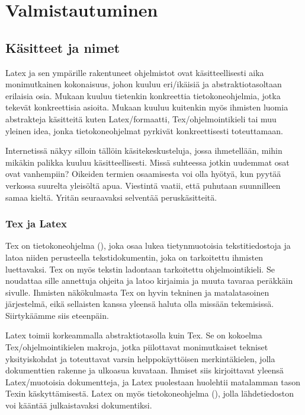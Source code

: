 \chapter{Valmistautuminen}

\section{Käsitteet ja nimet}

Latex ja sen ympärille rakentuneet ohjelmistot ovat käsitteellisesti
aika monimutkainen kokonaisuus, johon kuuluu eri\-/ikäisiä ja
abst\-rak\-tio\-ta\-sol\-taan erilaisia osia. Mukaan kuuluu tietenkin
konkreettia tie\-to\-kone\-oh\-jel\-mia, jotka tekevät konkreettisia
asioita. Mukaan kuuluu kuitenkin myös ihmisten luomia abst\-rak\-te\-ja
käsitteitä kuten Latex\-/formaatti, Tex\-/ohjelmointikieli tai muu
yleinen idea, jonka tieto\-kone\-ohjelmat pyrkivät konk\-reet\-tisesti
toteuttamaan.

Internetissä näkyy silloin tällöin käsitekeskusteluja, jossa
ihmetellään, mihin mikäkin palikka kuuluu käsitteellisesti. Missä
suhteessa jotkin uudemmat osat ovat vanhempiin? Oikeiden termien
osaamisesta voi olla hyötyä, kun pyytää verkossa suurelta yleisöltä
apua. Viestintä vaatii, että puhutaan suunnilleen samaa kieltä. Yritän
seuraavaksi selventää peruskäsitteitä.

\subsection{Tex ja Latex}

Tex on tietokone\-ohjelma (), joka osaa lukea tietynmuotoisia
tekstitiedostoja ja latoa niiden perusteella tekstidokumentin, joka on
tarkoitettu ihmisten luettavaksi. Tex on myös tekstin ladontaan
tarkoitettu ohjelmointikieli. Se noudattaa sille annettuja ohjeita ja
latoo kirjaimia ja muuta tavaraa peräkkäin sivulle. Ihmisten
näkökulmasta Tex on hyvin tekninen ja matalatasoinen järjestelmä, eikä
sellaisten kanssa yleensä haluta olla missään tekemisissä. Siirtykäämme
siis eteenpäin.

Latex toimii korkeammalla abstraktiotasolla kuin Tex. Se on kokoelma
Tex\-/ohjelmointikielen makroja, jotka piilottavat monimutkaiset
tekniset yksityiskohdat ja toteuttavat varsin helppokäyttöisen
merkintäkielen, jolla dokumenttien rakenne ja ulko\-asua kuvataan.
Ihmiset siis kirjoittavat yleensä Latex\-/muotoisia dokumentteja, ja
Latex puolestaan huolehtii matalamman tason Texin käskyttämisestä. Latex
on myös tietokone\-ohjelma (), jolla lähdetiedoston voi
kääntää julkaistavaksi dokumentiksi.

